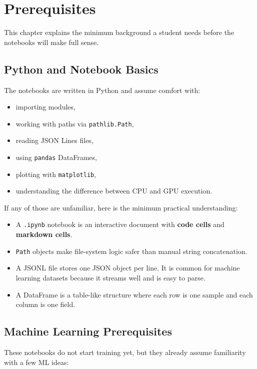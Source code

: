 \documentclass[11pt,a4paper]{report}
\begin{document}
\chapter{Prerequisites}

This chapter explains the minimum background a student needs before the notebooks will make full sense.

\section{Python and Notebook Basics}

The notebooks are written in Python and assume comfort with:

\begin{itemize}
\item importing modules,
\item working with paths via \texttt{pathlib.Path},
\item reading JSON Lines files,
\item using \texttt{pandas} DataFrames,
\item plotting with \texttt{matplotlib},
\item understanding the difference between CPU and GPU execution.
\end{itemize}

If any of those are unfamiliar, here is the minimum practical understanding:

\begin{itemize}
\item A \texttt{.ipynb} notebook is an interactive document with \textbf{code cells} and \textbf{markdown cells}.
\item \texttt{Path} objects make file-system logic safer than manual string concatenation.
\item A JSONL file stores one JSON object per line. It is common for machine learning datasets because it streams well and is easy to parse.
\item A DataFrame is a table-like structure where each row is one sample and each column is one field.
\end{itemize}

\section{Machine Learning Prerequisites}

These notebooks do not start training yet, but they already assume familiarity with a few ML ideas:
\end{document}
